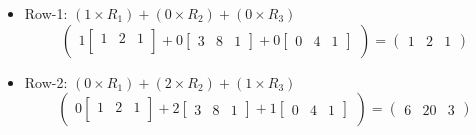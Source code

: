 \documentclass[a4paper,11pt]{article}
\numberwithin{equation}{section}
\begin{document}
\begin{itemize}
\begin{itemize}
        \begin{itemize}
            \item Row-1:
            $(1 \times R_1) + (0 \times R_2) + (0 \times R_3)$
            \[
            \begin{pmatrix}
                1
                \begin{bmatrix}
                    1 &
                    2&
                    1\\
                \end{bmatrix}+
                0
                \begin{bmatrix}
                    3&
                    8&
                    1
                \end{bmatrix}+
                0
                \begin{bmatrix}
                    0&
                    4&
                    1
                \end{bmatrix}
            \end{pmatrix}
            =
            \begin{pmatrix}
                1&
                2&
                1
            \end{pmatrix}
            \]
            \item Row-2:
            $(0 \times R_1) + (2 \times R_2) + (1 \times R_3)$
            \[
                \begin{pmatrix}
                    0
                    \begin{bmatrix}
                        1 &
                        2&
                        1\\
                    \end{bmatrix}+
                    2
                    \begin{bmatrix}
                        3&
                        8&
                        1
                    \end{bmatrix}+
                    1
                    \begin{bmatrix}
                        0&
                        4&
                        1
                    \end{bmatrix}
                \end{pmatrix}
                =
                \begin{pmatrix}
                    6&
                    20&
                    3
                \end{pmatrix}
\]
\end{itemize}
\end{itemize}
\end{itemize}
\end{document}
